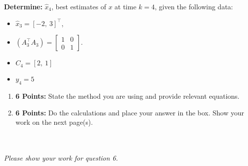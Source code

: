 \documentclass[letterpaper]{article}
\begin{document}
\textbf{Determine:}  $\widehat{x}_{4}$, best estimates of $x$ at time $k=4$, given the following data:

\begin{itemize}
\item $\widehat{x}_{3}=[-2, ~ 3]^\top$,
\item $\left( A_{3}^\top A_{3} \right)=\left[ \begin{array}{rr}  1&  0\\  0& 1\end{array} \right].$
\item $C_{4}=[ 2, ~1]$
\item $y_{4}=5$
\end{itemize}

\begin{enumerate}
\setlength{\itemsep}{.15in}
\renewcommand{\labelenumi}{(\alph{enumi})}
\setlength{\itemsep}{.1in}
\item \textbf{6 Points:} State the method you are using and provide relevant equations.
\vspace*{8cm}

\item  \textbf{6 Points:}  Do the calculations and place your answer in the box. Show your work on the next page(s).\\ \\

\\
\end{enumerate}



\newpage
\textit{Please show your work for question 6.}
\newpage
\end{document}
